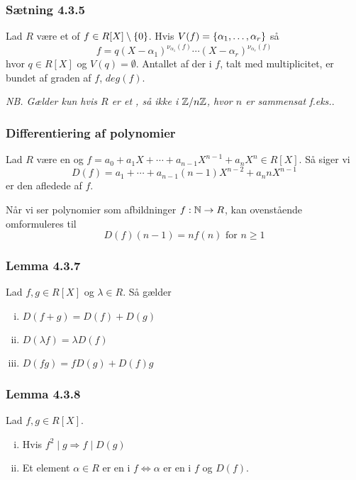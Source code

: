 \subsubsection{Sætning 4.3.5}
\label{Saetning 4.3.5}
Lad $R$ være et  of $f \in R[X]\setminus \{ 0 \}$. Hvis
$V(f) = \{ \alpha_1, \ldots,\alpha_r \}$ så
\begin{equation*}
  f = q(X - \alpha_1)^{\nu_{\alpha_1}(f)}\cdots(X -
  \alpha_r)^{\nu_{\alpha_r}(f)}
\end{equation*}
hvor $q \in R[X]$ og $V(q) = \emptyset$. Antallet af der i $f$,
talt med multiplicitet, er bundet af graden af $f$, $deg(f)$.

\textit{NB. Gælder kun hvis $R$ er et , så ikke i
$\mathbb{Z}/n\mathbb{Z}$, hvor $n$ er sammensat f.eks.}.

\subsubsection{Differentiering af polynomier}
\label{Differentiering af polynomier}
Lad $R$ være en  og $f = a_0 + a_1 X + \cdots + a_{n-1} X^{n-1} +
a_n X^n \in R[X]$. Så siger vi
\begin{equation*}
  D(f) = a_1 + \cdots + a_{n-1}(n-1)X^{n-2} + a_n n X^{n-1}
\end{equation*}
er den afledede af $f$.

Når vi ser polynomier som afbildninger $f: \mathbb{N} \rightarrow R$, kan ovenstående
omformuleres til 
\begin{equation*}
  D(f)(n-1) = nf(n) \text{ for } n \geq 1
\end{equation*}

\subsubsection{Lemma 4.3.7}
\label{Lemma 4.3.7}
Lad $f,g \in R[X]$ og $\lambda \in R$. Så gælder
\begin{enumerate}[(i)]
  \item $D(f + g) = D(f) + D(g)$
  \item $D(\lambda f) = \lambda D(f)$
  \item $D(fg) = fD(g) + D(f)g$
\end{enumerate}

\subsubsection{Lemma 4.3.8}
\label{Lemma 4.3.8}
Lad $f,g \in R[X]$.
\begin{enumerate}[(i)]
  \item Hvis $f^2 \mid g \Rightarrow f \mid D(g)$
  \item Et element $\alpha \in R$ er en  i $f \iff \alpha$
  er en  i $f$ og $D(f)$.
\end{enumerate}

